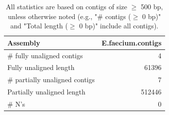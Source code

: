 \documentclass[12pt,a4paper]{article}
\begin{document}
\begin{table}[ht]
\begin{center}
\caption{All statistics are based on contigs of size $\geq$ 500 bp, unless otherwise noted (e.g., "\# contigs ($\geq$ 0 bp)" and "Total length ($\geq$ 0 bp)" include all contigs).}
\begin{tabular}{|l*{1}{|r}|}
\hline
Assembly & E.faecium.contigs \\ \hline
\# fully unaligned contigs & 4 \\ \hline
Fully unaligned length & 61396 \\ \hline
\# partially unaligned contigs & 7 \\ \hline
Partially unaligned length & 512446 \\ \hline
\# N's & 0 \\ \hline
\end{tabular}
\end{center}
\end{table}
\end{document}
